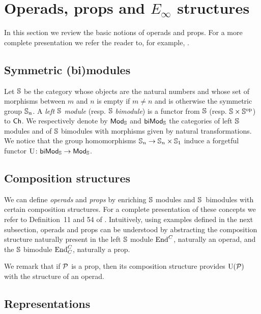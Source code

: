 
\section{Operads, props and $E_\infty$ structures} \label{s:operads and props}


In this section we review the basic notions of operads and props.
For a more complete presentation we refer the reader to, for example, \cite{markl2008props}.

\subsection{Symmetric (bi)modules}

Let $\S$ be the category whose objects are the natural numbers and whose set of morphisms between $m$ and $n$ is empty if $m \neq n$ and is otherwise the symmetric group $\S_n$.
A \textit{left $\S$ module} (resp. $\S$ \textit{bimodule}) is a functor from $\S$ (resp. $\S \times \S^\op$) to $\Ch$.
We respectively denote by $\smod$ and $\sbimod$ the categories of left $\S$ modules and of $\S$ bimodules with morphisms given by natural transformations.
We notice that the group homomorphisms $\S_n \to \S_n \times \S_1$ induce a forgetful functor $\U \colon \sbimod \to \smod$.

\subsection{Composition structures}

We can define \textit{operads} and \textit{props} by enriching $\S$ modules and \mbox{$\S$ bimodules} with certain composition structures.
For a complete presentation of these concepts we refer to Definition~11 and 54 of \cite{markl2008props}.
Intuitively, using examples defined in the next subsection, operads and props can be understood by abstracting the composition structure naturally present in the left $\S$ module $\End^C$, naturally an operad, and the $\S$ bimodule $\End^C_C$, naturally a prop.

We remark that if $\P$ is a prop, then its composition structure provides $\U(\P)$ with the structure of an operad.

\subsection{Representations}

